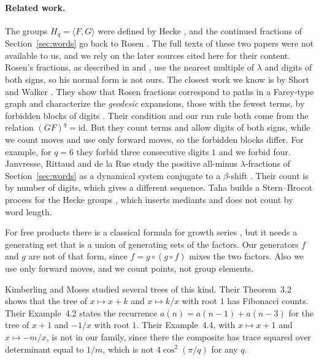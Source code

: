 \paragraph{Related work.} The groups $H_q=\langle F,G\rangle$ were defined by Hecke \cite{hecke1936}, and
the continued fractions of Section~\ref{sec:words} go back to Rosen \cite{rosen1954}. The full texts of
these two papers were not available to us, and we rely on the later sources cited here for their
content. Rosen's fractions, as described in \cite[Section~1.2]{rosen-schmidt} and \cite{short-walker},
use the nearest multiple of $\lambda$ and digits of both signs, so his normal form is not ours. The closest work
we know is by Short and Walker \cite{short-walker}. They show that Rosen fractions correspond to paths in
a Farey-type graph and characterize the \emph{geodesic} expansions, those with the fewest terms, by
forbidden blocks of digits \cite[Theorem~1.3 for even $q$ and Theorem~7.1 for odd $q$]{short-walker}. Their condition and our run rule both come
from the relation $(GF)^q=\mathrm{id}$. But they count terms and allow digits of both signs, while we
count moves and use only forward moves, so the forbidden blocks differ. For example, for $q=6$ they
forbid three consecutive digits $1$ and we forbid four. Janvresse, Rittaud and de la Rue study the
positive all-minus $\lambda$-fractions of Section~\ref{sec:words} as a dynamical system conjugate to a
$\beta$-shift \cite{jrr}. Their count is by number of digits, which gives a different sequence. Taha
builds a Stern--Brocot process for the Hecke groups \cite{taha}, which inserts mediants and does not
count by word length.

For free products there is a classical formula for growth series \cite{paris-varghese}, but it needs a
generating set that is a union of generating sets of the factors. Our generators $f$ and $g$ are not of
that form, since $f=g\circ(g\circ f)$ mixes the two factors. Also we use only forward moves, and we
count points, not group elements.

Kimberling and Moses \cite{kimberling-moses} studied several trees of this kind. Their Theorem~3.2 shows
that the tree of $x\mapsto x+k$ and $x\mapsto k/x$ with root $1$ has Fibonacci counts. Their
Example~4.2 states the recurrence $a(n)=a(n-1)+a(n-3)$ for the tree of $x+1$ and $-1/x$ with root
$1$. Their Example~4.4, with $x\mapsto x+1$ and $x\mapsto-m/x$, is not in our family, since there the
composite has trace squared over determinant equal to $1/m$, which is not $4\cos^2(\pi/q)$ for any $q$.

